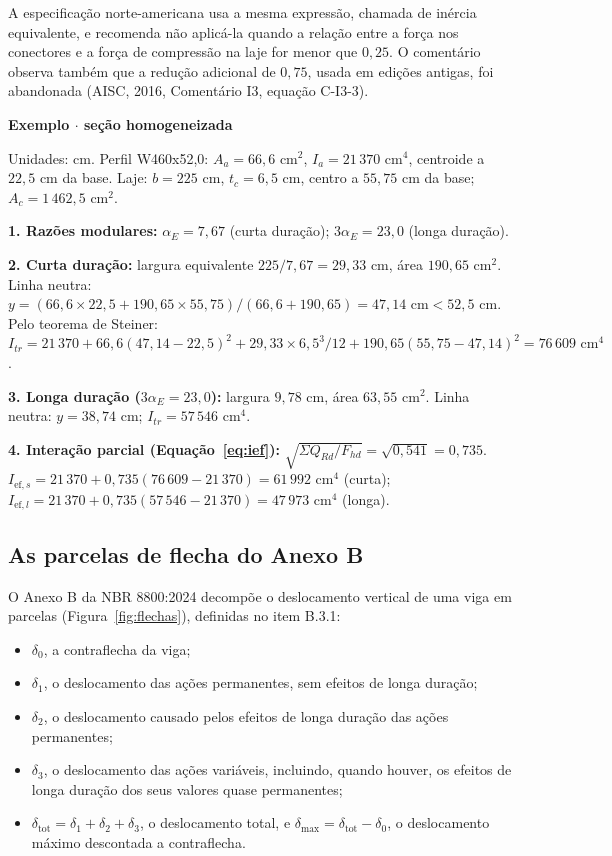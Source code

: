 \documentclass[11pt,a4paper]{article}
\newcommand{\caixaexemplo}[2]{%
  \par\vspace{6pt}\noindent\colorbox{examplebg}{%
    \parbox{\dimexpr\linewidth-2\fboxsep\relax}{%
      \vspace{4pt}\textbf{\color{exampleaccent}#1}\par\vspace{3pt}#2\vspace{4pt}%
    }%
  }\par\vspace{6pt}%
}
\begin{document}
A especificação norte-americana usa a mesma expressão, chamada de inércia equivalente, e recomenda não aplicá-la quando a relação entre a força nos conectores e a força de compressão na laje for menor que $0{,}25$. O comentário observa também que a redução adicional de $0{,}75$, usada em edições antigas, foi abandonada (AISC, 2016, Comentário I3, equação C-I3-3).

\caixaexemplo{Exemplo $\cdot$ seção homogeneizada}{%
Unidades: cm. Perfil W460x52,0: $A_a = 66{,}6\text{ cm}^2$, $I_a = 21\,370\text{ cm}^4$, centroide a $22{,}5\text{ cm}$ da base. Laje: $b = 225\text{ cm}$, $t_c = 6{,}5\text{ cm}$, centro a $55{,}75\text{ cm}$ da base; $A_c = 1\,462{,}5\text{ cm}^2$.\par\vspace{3pt}
\textbf{1. Razões modulares:} $\alpha_E = 7{,}67$ (curta duração); $3\alpha_E = 23{,}0$ (longa duração).\par
\textbf{2. Curta duração:} largura equivalente $225/7{,}67 = 29{,}33\text{ cm}$, área $190{,}65\text{ cm}^2$. Linha neutra: $y = (66{,}6 \times 22{,}5 + 190{,}65 \times 55{,}75)/(66{,}6 + 190{,}65) = 47{,}14\text{ cm} < 52{,}5\text{ cm}$. Pelo teorema de Steiner: $I_{tr} = 21\,370 + 66{,}6(47{,}14 - 22{,}5)^2 + 29{,}33 \times 6{,}5^3/12 + 190{,}65(55{,}75 - 47{,}14)^2 = 76\,609\text{ cm}^4$.\par
\textbf{3. Longa duração ($3\alpha_E = 23{,}0$):} largura $9{,}78\text{ cm}$, área $63{,}55\text{ cm}^2$. Linha neutra: $y = 38{,}74\text{ cm}$; $I_{tr} = 57\,546\text{ cm}^4$.\par
\textbf{4. Interação parcial (Equação~\ref{eq:ief}):} $\sqrt{\Sigma Q_{Rd}/F_{hd}} = \sqrt{0{,}541} = 0{,}735$. $I_{\text{ef},s} = 21\,370 + 0{,}735(76\,609 - 21\,370) = 61\,992\text{ cm}^4$ (curta); $I_{\text{ef},l} = 21\,370 + 0{,}735(57\,546 - 21\,370) = 47\,973\text{ cm}^4$ (longa).}

\subsection{As parcelas de flecha do Anexo B}

O Anexo B da NBR 8800:2024 decompõe o deslocamento vertical de uma viga em parcelas (Figura~\ref{fig:flechas}), definidas no item B.3.1:
\begin{itemize}
  \item $\delta_0$, a contraflecha da viga;
  \item $\delta_1$, o deslocamento das ações permanentes, sem efeitos de longa duração;
  \item $\delta_2$, o deslocamento causado pelos efeitos de longa duração das ações permanentes;
  \item $\delta_3$, o deslocamento das ações variáveis, incluindo, quando houver, os efeitos de longa duração dos seus valores quase permanentes;
  \item $\delta_{\text{tot}} = \delta_1 + \delta_2 + \delta_3$, o deslocamento total, e $\delta_{\max} = \delta_{\text{tot}} - \delta_0$, o deslocamento máximo descontada a contraflecha.
\end{itemize}
\end{document}
